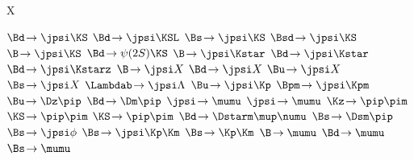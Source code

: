 
\newmathsymbol{\BF}           {\xspace}
\newmathsymbol{\BR}           {\BF}

\renewcommand{\to}            {\ensuremath{\rightarrow}\xspace}
\newcommand{\decay}[2]        {\ensuremath{#1\!\to #2}\xspace}
\newcommand{\decaybf}[2]      {\ensuremath{#1\!\pmb{\to} #2}\xspace} %

\newmathsymbol{\Xparticle}      {X\xspace}

\newmathsymbol{\BdToJpsiKS}      {\decay{\Bd}{\jpsi\KS}}
\newmathsymbol{\BdToJpsiKSL}     {\decay{\Bd}{\jpsi\KSL}}
\newmathsymbol{\BsToJpsiKS}      {\decay{\Bs}{\jpsi\KS}}
\newmathsymbol{\BsdToJpsiKS}     {\decay{\Bsd}{\jpsi\KS}}
\newmathsymbol{\BToJpsiKS}       {\decay{\B}{\jpsi\KS}}
\newmathsymbol{\BdToPsiTwoSKS}   {\decay{\Bd}{\psi(2S)\KS}}
\newmathsymbol{\BToJpsiKstar}    {\decay{\B}{\jpsi\Kstar}}
\newmathsymbol{\BdToJpsiKstar}   {\decay{\Bd}{\jpsi\Kstar}}
\newmathsymbol{\BdToJpsiKstarz}  {\decay{\Bd}{\jpsi\Kstarz}}
\newmathsymbol{\BToJpsiX}        {\decay{\B}{\jpsi X}}
\newmathsymbol{\BdToJpsiX}       {\decay{\Bd}{\jpsi X}}
\newmathsymbol{\BuToJpsiX}       {\decay{\Bu}{\jpsi X}}
\newmathsymbol{\BsToJpsiX}       {\decay{\Bs}{\jpsi X}}
\newmathsymbol{\LbToJpsiLambda}  {\decay{\Lambdab}{\jpsi\Lambda}}
\newmathsymbol{\BuToJpsiK}       {\decay{\Bu}{\jpsi\Kp}}
\newmathsymbol{\BuToJpsiKcc}     {\decay{\Bpm}{\jpsi\Kpm}}
\newmathsymbol{\BuToDpi}         {\decay{\Bu}{\Dz\pip}}
\newmathsymbol{\BdToDpi}         {\decay{\Bd}{\Dm\pip}}
\newmathsymbol{\JpsiToMuMu}      {\decay{\jpsi}{\mumu}}
\newmathsymbol{\JpsiTomumu}      {\decay{\jpsi}{\mumu}}
\newmathsymbol{\KzToPiPi}        {\decay{\Kz}{\pip\pim}}
\newmathsymbol{\KSToPiPi}        {\decay{\KS}{\pip\pim}}
\newmathsymbol{\KSTopipi}        {\decay{\KS}{\pip\pim}}
\newmathsymbol{\BdToDstarmunu}   {\decay{\Bd}{\Dstarm\mup\numu}}
\newmathsymbol{\BsToDspi}        {\decay{\Bs}{\Dsm\pip}}
\newmathsymbol{\BsToJpsiphi}     {\decay{\Bs}{\jpsi\phi}}
\newmathsymbol{\BsToJpsiKK}      {\decay{\Bs}{\jpsi\Kp\Km}}
\newmathsymbol{\BsToKK}          {\decay{\Bs}{\Kp\Km}}
\newmathsymbol{\BToMuMu}         {\decay{\B}{\mumu}}
\newmathsymbol{\BdToMuMu}        {\decay{\Bd}{\mumu}}
\newmathsymbol{\BsToMuMu}        {\decay{\Bs}{\mumu}}
\newmathsymbol{\inclJPsi}        {\ \jpsi}

